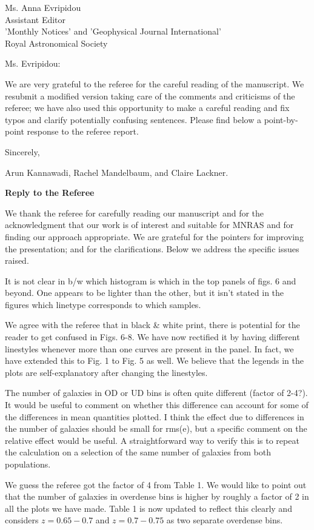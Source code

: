 \documentclass[english]{letter}
\begin{document}
\date{\today}


\begin{letter}{Ms. Anna Evripidou\\ Assistant Editor\\ 'Monthly Notices' and 'Geophysical Journal International' \\
Royal Astronomical Society}

\opening{Ms. Evripidou:}

We are very grateful to the referee for the careful reading of the manuscript.
We resubmit a modified version taking care of the comments and criticisms of the referee; we have also
used this opportunity to make a careful reading and fix typos and clarify potentially confusing sentences. 
Please find below a point-by-point response to the referee report.

\closing{Sincerely,}
Arun Kannawadi, Rachel Mandelbaum, and Claire Lackner.
\end{letter}
\vspace{20pt}
{\bf Reply to the Referee}

We thank the referee for carefully reading our manuscript and for the acknowledgment that our work is of interest
and suitable for MNRAS and for finding our approach appropriate. We are grateful for the pointers for improving the presentation; and for the clarifications. 
Below we address the specific issues raised.

\begin{shaded}
It is not clear in b/w which histogram is which in the top panels of figs. 6 and beyond. One appears to be lighter than the other, but it isn't stated in the figures which linetype corresponds to which samples.
\end{shaded}
\noindent
We agree with the referee that in black \& white print, there is potential for the reader to get confused in Figs. 6-8.
We have now rectified it by having different linestyles whenever more than one curves are present in the panel. In fact, we have extended this to Fig. 1 to Fig. 5 as well. We believe that the legends in the plots are self-explanatory after changing the linestyles.

\begin{shaded}
The number of galaxies in OD or UD bins is often quite different (factor of 2-4?). It would be useful to comment on whether this difference can account for some of the differences in mean quantities plotted. I think the effect due to differences in the number of galaxies should be small for rms(e), but a specific comment on the relative effect would be useful. A straightforward way to verify this is to repeat the calculation on a selection of the same number of galaxies from both populations.
\end{shaded}
\noindent 
We guess the referee got the factor of 4 from Table 1. We would like to point out that the number of galaxies in overdense bins is higher by roughly a factor of 2 in all the plots we have made. Table 1 is now updated to reflect this clearly and considers $z=0.65-0.7$ and $z=0.7-0.75$ as two separate overdense bins. 
\end{document}
